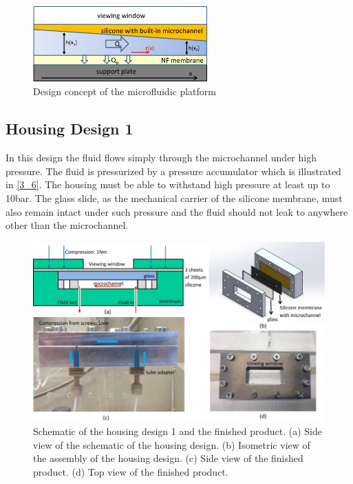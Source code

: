 \begin{figure}[ht]%
\centering
\includegraphics[width=0.6\textwidth]{figures/designandfabrication/figure3_27}%
\caption{Design concept of the microfluidic platform}%
\label{figure3_27}%
\end{figure}

\subsection{Housing Design 1}
\label{3_5_1}
In this design the fluid flows simply through the microchannel under high pressure. The fluid is pressurized by a pressure accumulator which is illustrated in \autoref{3_6}. The housing must be able to withstand high pressure at least up to 10bar. The glass slide, as the mechanical carrier of the silicone membrane, must also remain intact under such pressure and the fluid should not leak to anywhere other than the microchannel.

\begin{figure}[!h]%
\centering
\includegraphics[width=1\textwidth]{figures/designandfabrication/figure3_28}%
\caption{Schematic of the housing design 1 and the finished product. (a) Side view of the schematic of the housing design. (b) Isometric view of the assembly of the housing design. (c) Side view of the finished product. (d) Top view of the finished product.}%
\label{figure3_28}%
\end{figure}

